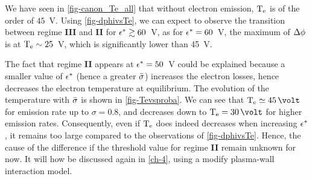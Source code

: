    We have seen in \ref{fig-canon_Te_all} that without electron emission, $\mathrm{T_e}$ is of the order of $45$~V.
   Using \cref{fig-dphivsTe}, we can expect to observe the transition between regime {\bf III} and {\bf II} for $\epsilon^{*} \gtrsim 60$~V, as for $\epsilon^{*} = 60$~V, the maximum of $\Delta \phi$ is at $\mathrm{T_e}\sim 25$~V, which is significantly lower than 45~V.
   
   The fact that regime {\bf II} appears at $\epsilon^{*}=50$~V could be explained because a smaller value of $\epsilon^{*}$ (hence a greater $ \bar{\sigma }$) increases the electron losses, hence decreases the electron temperature at equilibrium.
   The evolution of the temperature with  $ \bar{\sigma }$ is shown in \cref{fig-Tevsproba}.
   We can see that $\Te \simeq 45\,\volt$ for emission rate up to $\sigma = 0.8$, and decreases down to $\Te=30\,\volt$ for higher emission rates.
   Consequently, even if $\mathrm{T_e}$ does indeed decreases when increasing $\epsilon^{*}$, it remains too large compared to the observations of \cref{fig-dphivsTe}.
   Hence, the cause of the difference if the threshold value for regime {\bf II} remain unknown for now.
   It will how be discussed again in \cref{ch-4}, using a modify plasma-wall interaction model.
   
   
  